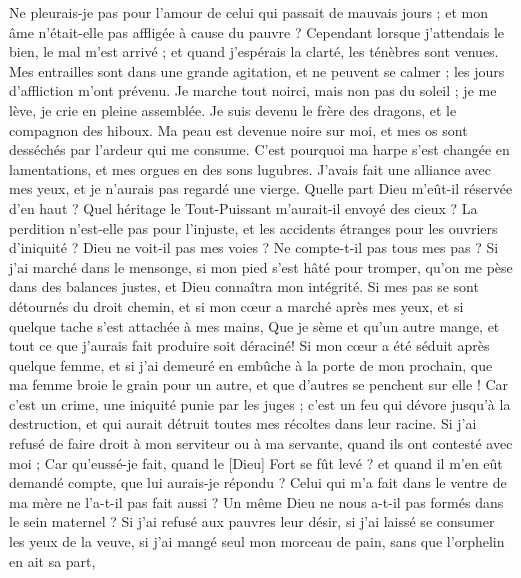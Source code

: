\begin{multicols}{2}
Ne pleurais-je pas pour l'amour de celui qui passait de mauvais jours ; et mon âme n'était-elle pas affligée à cause du pauvre ?
Cependant lorsque j'attendais le bien, le mal m'est arrivé ; et quand j'espérais la clarté, les ténèbres sont venues. 
Mes entrailles sont dans une grande agitation, et ne peuvent se calmer ; les jours d'affliction m'ont prévenu. 
Je marche tout noirci, mais non pas du soleil ; je me lève, je crie en pleine assemblée. 
Je suis devenu le frère des dragons, et le compagnon des hiboux.
Ma peau est devenue noire sur moi, et mes os sont desséchés par l'ardeur qui me consume.
C'est pourquoi ma harpe s'est changée en lamentations, et mes orgues en des sons lugubres.
\VerseOne{}J'avais fait une alliance avec mes yeux, et je n'aurais pas regardé une vierge.
Quelle part Dieu m'eût-il réservée d'en haut ? Quel héritage le Tout-Puissant m'aurait-il envoyé des cieux ?
La perdition n'est-elle pas pour l'injuste, et les accidents étranges pour les ouvriers d'iniquité ?
Dieu ne voit-il pas mes voies ? Ne compte-t-il pas tous mes pas ?
Si j'ai marché dans le mensonge, si mon pied s'est hâté pour tromper,
qu'on me pèse dans des balances justes, et Dieu connaîtra mon intégrité.
Si mes pas se sont détournés du droit chemin, et si mon cœur a marché après mes yeux, et si quelque tache s'est attachée à mes mains,
Que je sème et qu'un autre mange, et tout ce que j'aurais fait produire soit déraciné!
Si mon cœur a été séduit après quelque femme, et si j'ai demeuré en embûche à la porte de mon prochain,
que ma femme broie le grain pour un autre, et que d'autres se penchent sur elle !
Car c'est un crime, une iniquité punie par les juges ;
c'est un feu qui dévore jusqu'à la destruction, et qui aurait détruit toutes mes récoltes dans leur racine.
Si j'ai refusé de faire droit à mon serviteur ou à ma servante, quand ils ont contesté avec moi ;
Car qu'eussé-je fait, quand le [Dieu] Fort se fût levé ? et quand il m'en eût demandé compte, que lui aurais-je répondu ?
Celui qui m'a fait dans le ventre de ma mère ne l'a-t-il pas fait aussi ? Un même Dieu ne nous a-t-il pas formés dans le sein maternel ?
Si j'ai refusé aux pauvres leur désir, si j'ai laissé se consumer les yeux de la veuve,
si j'ai mangé seul mon morceau de pain, sans que l'orphelin en ait sa part,

\end{multicols}
